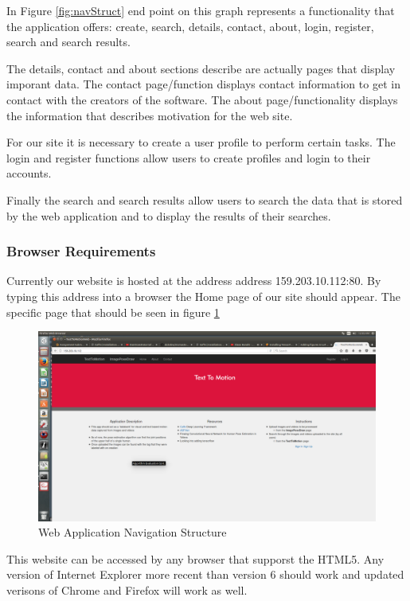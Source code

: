 \documentclass{scrreprt}
\begin{document}
In Figure \ref{fig:navStruct} end point on this graph represents a
functionality that the application offers: create, search, details, contact,
about, login, register, search and search results.

The details, contact and about sections describe are actually pages that
display imporant data.  The contact page/function displays contact information
to get in contact with the creators of the software.  The about
page/functionality displays the information that describes motivation for the
web site.

For our site it is necessary to create a user profile to perform certain tasks.
The login and register functions allow users to create profiles and login to
their accounts.

Finally the search and search results allow users to search the data that is
stored by the web application and to display the results of their searches.

\subsubsection{Browser Requirements}

Currently our website is hosted at the address address 159.203.10.112:80. By
typing this address into a browser the Home page of our site should appear. The
specific page that should be seen in figure \ref{fig:homePage}

\begin{figure}
  \includegraphics[width=\linewidth]{HomePage.png}
  \caption{Web Application Navigation Structure}
  \label{fig:homePage}
\end{figure}

This website can be accessed by any browser that supporst the HTML5.  Any
version of Internet Explorer more recent than version 6 should work and updated
verisons of Chrome and Firefox will work as well.
\end{document}
